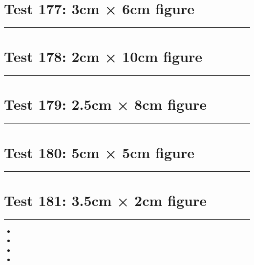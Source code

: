 \documentclass[a4paper,11pt]{article}
\begin{document}
\section*{Test 177: 3cm × 6cm figure}
\begin{swarmwrap}%
  \begin{minipage}[t]{3cm}
    \centering
    \rule{\linewidth}{6cm}
  \end{minipage}%
\end{swarmwrap}%
\swarmwrapnext
\lipsum[144]
\lipsum[145]
\lipsum[146]
\lipsum[147]
\lipsum[148]
\section*{Test 178: 2cm × 10cm figure}
\begin{swarmwrap}%
  \begin{minipage}[t]{2cm}
    \centering
    \rule{\linewidth}{10cm}
  \end{minipage}%
\end{swarmwrap}%
\swarmwrapnext
\lipsum[23]
\lipsum[24]
\lipsum[25]
\lipsum[26]
\section*{Test 179: 2.5cm × 8cm figure}
\begin{swarmwrap}%
  \begin{minipage}[t]{2cm}
    \centering
    \rule{\linewidth}{8cm}
  \end{minipage}%
\end{swarmwrap}%
\swarmwrapnext
\lipsum[144]
\lipsum[145]
\lipsum[146]
\lipsum[147]
\lipsum[148]
\lipsum[149]
\section*{Test 180: 5cm × 5cm figure}
\begin{swarmwrap}%
  \begin{minipage}[t]{5cm}
    \centering
    \rule{\linewidth}{5cm}
  \end{minipage}%
\end{swarmwrap}%
\swarmwrapnext
\lipsum[127]
\lipsum[128]
\lipsum[129]
\lipsum[130]
\lipsum[131]
\lipsum[132]
\section*{Test 181: 3.5cm × 2cm figure}
\begin{swarmwrap}%
  \begin{minipage}[t]{3cm}
    \centering
    \rule{\linewidth}{2cm}
  \end{minipage}%
\end{swarmwrap}
\begin{itemize}
  \item \swarmwrapnext\lipsum[76][1-4]
  \item \lipsum[78][1-3]
  \item \lipsum[79][1-3]
  \item \lipsum[80][1-3]
\end{itemize}
\end{document}
